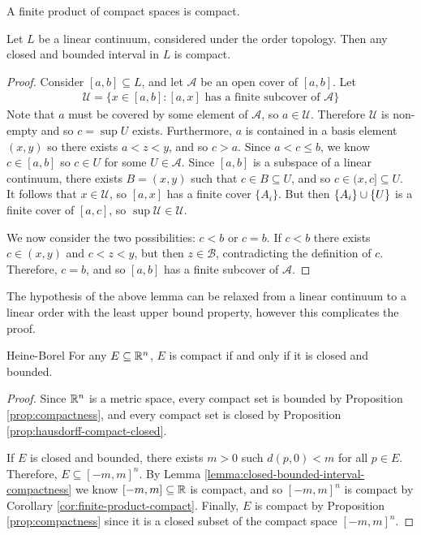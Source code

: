 \begin{cor}\label{cor:finite-product-compact}
    A finite product of compact spaces is compact.
\end{cor}

\begin{lemma}\label{lemma:closed-bounded-interval-compactness}
    Let $L$ be a linear continuum, considered under the order topology. Then any closed and bounded interval in $L$ is compact.
\end{lemma}

\begin{proof}
    Consider $[a, b] \subseteq L$, and let $\mathcal{A}$ be an open cover of $[a, b]$. Let
    \begin{align}
        \mathcal{U} = \{x \in [a, b] : [a, x] \textrm{ has a finite subcover of }\mathcal{A}\}
    \end{align}
    Note that $a$ must be covered by some element of $\mathcal{A}$, so $a \in \mathcal{U}$. Therefore $\mathcal{U}$ is non-empty and so $c = \sup U$ exists. Furthermore, $a$ is contained in a basis element $(x, y)$ so there exists $a < z < y$, and so $c > a$. Since $a < c \leq b$, we know $c \in [a, b]$ so $c \in U$ for some $U \in \mathcal{A}$. Since $[a, b]$ is a subspace of a linear continuum, there exists $B = (x, y)$ such that $c \in B \subseteq U$, and so $c \in (x, c] \subseteq U$. It follows that $x \in \mathcal{U}$, so $[a, x]$ has a finite cover $\{A_i\}$. But then $\{A_i\}\cup \{U\}$ is a finite cover of $[a, c]$, so $\sup \mathcal{U} \in \mathcal{U}$.

    We now consider the two possibilities: $c < b$ or $c = b$. If $c < b$ there exists $c \in (x, y)$ and $c < z < y$, but then $z \in \mathcal{B}$, contradicting the definition of $c$. Therefore, $c = b$, and so $[a, b]$ has a finite subcover of $\mathcal{A}$.
\end{proof}

\begin{rmk}
    The hypothesis of the above lemma can be relaxed from a linear continuum to a linear order with the least upper bound property, however this complicates the proof.
\end{rmk}

\begin{thm}Heine-Borel\label{thm:heine-borel-topology}\proofbreak
    For any $E \subseteq \mathbb{R}^{n}$, $E$ is compact if and only if it is closed and bounded.
\end{thm}

\begin{proof}
    Since $\mathbb{R}^n$ is a metric space, every compact set is bounded by Proposition \ref{prop:compactness}, and every compact set is closed by Proposition \ref{prop:hausdorff-compact-closed}.

    If $E$ is closed and bounded, there exists $m > 0$ such $d(p, 0) < m$ for all $p \in E$. Therefore, $E \subseteq [-m, m]^n$. By Lemma \ref{lemma:closed-bounded-interval-compactness} we know $[-m, m] \subseteq \mathbb{R}$ is compact, and so $[-m, m]^n$ is compact by Corollary \ref{cor:finite-product-compact}. Finally, $E$ is compact by Proposition \ref{prop:compactness} since it is a closed subset of the compact space $[-m, m]^n$.
\end{proof}

